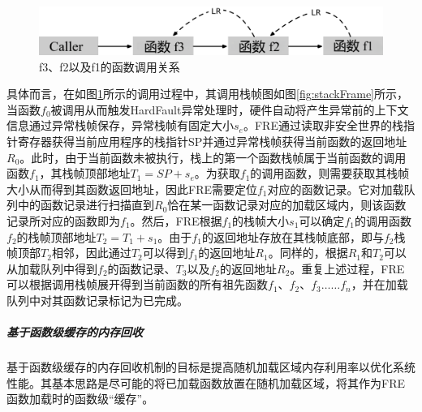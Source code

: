 \documentclass[UTF8,12pt,a4paper]{ctexart}
\numberwithin{figure}{section}
\begin{document}
\begin{figure}[H]
    \centering
    \includegraphics[scale=0.35]{graph/funcCall.png}
    \caption{f3、f2以及f1的函数调用关系}
    \label{fig:funcCall}
\end{figure}
\par 具体而言，在如图\ref{fig:funcCall}所示的调用过程中，其调用栈帧图如图\ref{fig:stackFrame}所示，当函数$f_0$被调用从而触发HardFault异常处理时，硬件自动将产生异常前的上下文信息通过异常栈帧保存，异常栈帧有固定大小$s_e$。FRE通过读取非安全世界的栈指针寄存器获得当前应用程序的栈指针SP并通过异常栈帧获得当前函数的返回地址$R_0$。此时，由于当前函数未被执行，栈上的第一个函数栈帧属于当前函数的调用函数$f_1$，其栈帧顶部地址$T_1=SP+s_e$。为获取$f_1$的调用函数，则需要获取其栈帧大小从而得到其函数返回地址，因此FRE需要定位$f_1$对应的函数记录。它对加载队列中的函数记录进行扫描直到$R_0$恰在某一函数记录对应的加载区域内，则该函数记录所对应的函数即为$f_1$。然后，FRE根据$f_1$的栈帧大小$s_1$可以确定$f_1$的调用函数$f_2$的栈帧顶部地址$T_2=T_1+s_1$。由于$f_1$的返回地址存放在其栈帧底部，即与$f_2$栈帧顶部$T_2$相邻，因此通过$T_2$可以得到$f_1$的返回地址$R_1$。同样的，根据$R_1$和$T_2$可以从加载队列中得到$f_2$的函数记录、$T_3$以及$f_2$的返回地址$R_2$。重复上述过程，FRE可以根据调用栈帧展开得到当前函数的所有祖先函数$f_1、f_2、f_3……f_n$，并在加载队列中对其函数记录标记为已完成。
\subparagraph{基于函数级缓存的内存回收}
\par 基于函数级缓存的内存回收机制的目标是提高随机加载区域内存利用率以优化系统性能。其基本思路是尽可能的将已加载函数放置在随机加载区域，将其作为FRE函数加载时的函数级“缓存”。
\end{document}
